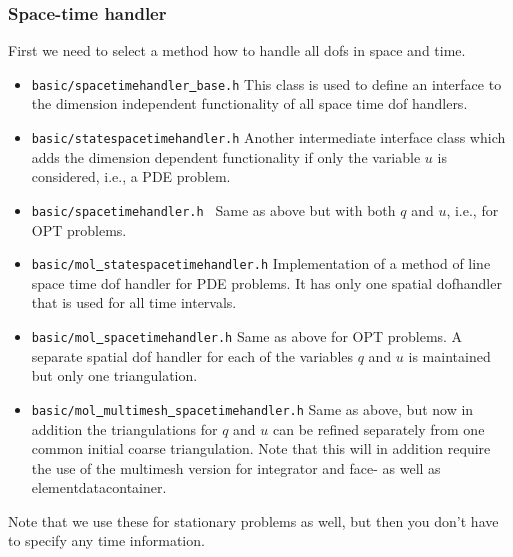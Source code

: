 \subsubsection{Space-time handler}
First we need to select a method how to handle all dofs in space and time.
\begin{itemize}
\item \texttt{basic/spacetimehandler\underline{ }base.h} This class is used to define 
  an interface to the dimension independent functionality of all space time dof handlers.
\item \texttt{basic/statespacetimehandler.h} Another intermediate interface class which adds 
  the dimension dependent functionality if only the variable $u$ is considered, i.e., a 
  PDE problem.
\item \texttt{basic/spacetimehandler.h } Same as above but with both $q$ and $u$, i.e., for
  OPT problems.
\item \texttt{basic/mol\underline{ }statespacetimehandler.h} Implementation of a method of 
  line space time dof handler for PDE problems. It has only one spatial 
  dofhandler that is used for all time intervals.
\item \texttt{basic/mol\underline{ }spacetimehandler.h} Same as above for OPT problems.
  A separate spatial dof handler for each of the variables $q$ and $u$ is maintained 
  but only one triangulation.
\item \texttt{basic/mol\underline{ }multimesh\underline{ }spacetimehandler.h}
  Same as above, but now in addition the triangulations for $q$ and $u$ can be refined
  separately from one common initial coarse triangulation. Note that this will
  in addition require the use of the multimesh version for integrator and 
  face- as well as elementdatacontainer.
\end{itemize}
Note that we use these for stationary problems as well, but then you don't have to specify
any time information.

